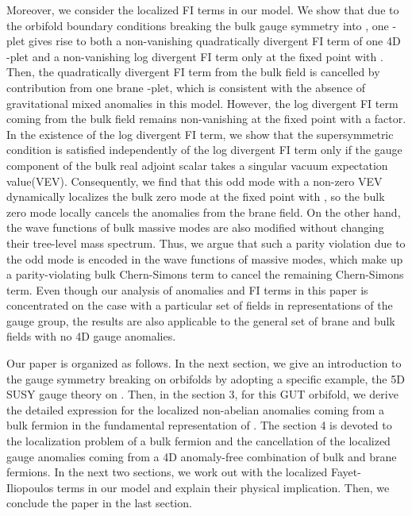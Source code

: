 \documentclass[a4paper,12pt]{article}
\begin{document}
Moreover, we consider the localized FI terms in our model.
We show that due to the orbifold boundary conditions breaking the bulk gauge
symmetry into \coordHE{}, one \coordHE{}-plet gives rise to both a non-vanishing
quadratically divergent FI term of one 4D \coordHE{}-plet and
a non-vanishing log divergent FI term only at the fixed point with \coordHE{}.
Then, the quadratically divergent FI term from the bulk field
is cancelled by contribution from one brane \coordHE{}-plet,
which is consistent with the absence of gravitational
mixed anomalies in this model. However, the log divergent
FI term coming from the bulk field remains non-vanishing at the fixed point
with a \coordHE{} factor.
In the existence of the log divergent FI term,
we show that the supersymmetric condition is satisfied independently of
the log divergent FI term only if the \coordHE{} gauge component of the
bulk real adjoint scalar takes a singular vacuum expectation value(VEV).
Consequently, we find that this odd mode with a non-zero VEV dynamically
localizes the bulk zero mode at the fixed point with \coordHE{}, so the bulk zero mode
locally cancels the anomalies from the brane field.  
On the other hand, the wave functions of bulk massive modes are also modified 
without changing their tree-level mass spectrum.
Thus, we argue that
such a parity violation due to the odd mode 
is encoded in the wave functions of massive modes,
which make up a parity-violating bulk Chern-Simons term to cancel 
the remaining Chern-Simons term.
Even though our analysis of anomalies and FI terms in this paper 
is concentrated on the case 
with a particular set of fields in representations of the gauge group, 
the results are also applicable to the general set of brane and bulk fields 
with no 4D gauge anomalies.  

Our paper is organized as follows. In the next section, we give an introduction
to the gauge symmetry breaking on orbifolds by adopting a specific example, 
the 5D SUSY \coordHE{} gauge theory on \coordHE{}.
Then, in the section 3, for this GUT orbifold, 
we derive the detailed expression for the localized non-abelian anomalies
coming from a bulk fermion in the fundamental representation of \coordHE{}. 
The section 4 is devoted to the localization problem of a bulk fermion and the
cancellation of the localized gauge anomalies coming from a 4D anomaly-free 
combination of bulk and brane fermions. In the next two sections, 
we work out with 
the localized Fayet-Iliopoulos terms in our model 
and explain their physical implication.
Then, we conclude the paper in the last section. 
\end{document}
